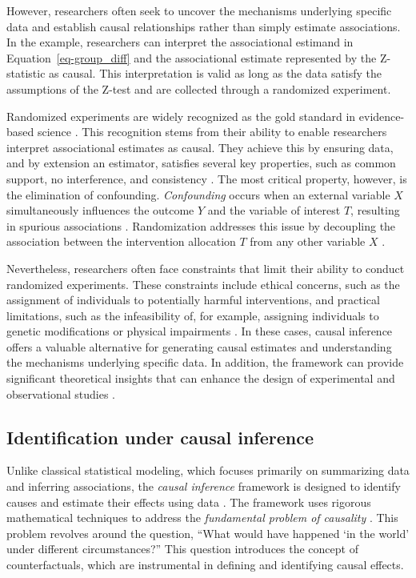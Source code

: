 \documentclass[
  authoryear,
  review,
  1p]{elsarticle}
\begin{document}
However, researchers often seek to uncover the mechanisms underlying
specific data and establish causal relationships rather than simply
estimate associations. In the example, researchers can interpret the
associational estimand in Equation~\ref{eq-group_diff} and the
associational estimate represented by the Z-statistic as causal. This
interpretation is valid as long as the data satisfy the assumptions of
the Z-test and are collected through a randomized experiment.

Randomized experiments are widely recognized as the gold standard in
evidence-based science \citep{Hariton_et_al_2018, Hansson_2014}. This
recognition stems from their ability to enable researchers interpret
associational estimates as causal. They achieve this by ensuring data,
and by extension an estimator, satisfies several key properties, such as
common support, no interference, and consistency
\citep{Morgan_et_al_2014, Neal_2020}. The most critical property,
however, is the elimination of confounding. \emph{Confounding} occurs
when an external variable \(X\) simultaneously influences the outcome
\(Y\) and the variable of interest \(T\), resulting in spurious
associations \citep{Everitt_et_al_2010}. Randomization addresses this
issue by decoupling the association between the intervention allocation
\(T\) from any other variable \(X\)
\citep{Morgan_et_al_2014, Neal_2020}.

Nevertheless, researchers often face constraints that limit their
ability to conduct randomized experiments. These constraints include
ethical concerns, such as the assignment of individuals to potentially
harmful interventions, and practical limitations, such as the
infeasibility of, for example, assigning individuals to genetic
modifications or physical impairments \citep{Neal_2020}. In these cases,
causal inference offers a valuable alternative for generating causal
estimates and understanding the mechanisms underlying specific data. In
addition, the framework can provide significant theoretical insights
that can enhance the design of experimental and observational studies
\citep{McElreath_2020}.

\subsection{Identification under causal inference}\label{sec-appendix-B}

Unlike classical statistical modeling, which focuses primarily on
summarizing data and inferring associations, the \emph{causal inference}
framework is designed to identify causes and estimate their effects
using data \citep{Shaughnessy_et_al_2010, Neal_2020}. The framework uses
rigorous mathematical techniques to address the \emph{fundamental
problem of causality}
\citep{Pearl_2009, Pearl_et_al_2016, Morgan_et_al_2014}. This problem
revolves around the question, ``What would have happened `in the world'
under different circumstances?'' This question introduces the concept of
counterfactuals, which are instrumental in defining and identifying
causal effects.
\end{document}
